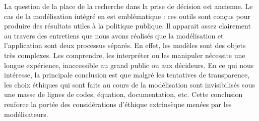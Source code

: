 La question de la place de la  recherche dans la prise de décision est ancienne. Le cas de la modélisation intégré en est emblématique : ces outils sont conçus pour produire des résultats utiles à la politique publique. Il apparait assez clairement au travers des entretiens que nous avons réalisés que la modélisation et l'application sont deux processus séparés. En effet, les modèles sont des objets très complexes. Les comprendre, les interpréter ou les manipuler nécessite une longue expérience, inaccessible au grand public ou aux décideurs. En ce qui nous intéresse, la principale conclusion est que malgré les tentatives de transparence, les choix éthiques qui sont faits au cours de la modélisation sont invisibilisés sous une masse de lignes de codes, équation, documentation, etc. Cette conclusion renforce la portée des considérations d'éthique extrinsèque menées par les modélisateurs. 








